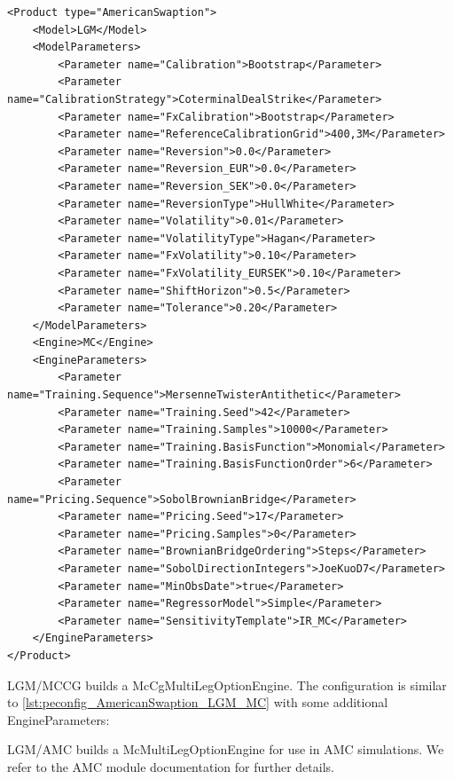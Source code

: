 \begin{longlisting}
\begin{verbatim}
<Product type="AmericanSwaption">
    <Model>LGM</Model>
    <ModelParameters>
        <Parameter name="Calibration">Bootstrap</Parameter>
        <Parameter name="CalibrationStrategy">CoterminalDealStrike</Parameter>
        <Parameter name="FxCalibration">Bootstrap</Parameter>
        <Parameter name="ReferenceCalibrationGrid">400,3M</Parameter>
        <Parameter name="Reversion">0.0</Parameter>
        <Parameter name="Reversion_EUR">0.0</Parameter>
        <Parameter name="Reversion_SEK">0.0</Parameter>
        <Parameter name="ReversionType">HullWhite</Parameter>
        <Parameter name="Volatility">0.01</Parameter>
        <Parameter name="VolatilityType">Hagan</Parameter>
        <Parameter name="FxVolatility">0.10</Parameter>
        <Parameter name="FxVolatility_EURSEK">0.10</Parameter>
        <Parameter name="ShiftHorizon">0.5</Parameter>
        <Parameter name="Tolerance">0.20</Parameter>
    </ModelParameters>
    <Engine>MC</Engine>
    <EngineParameters>
        <Parameter name="Training.Sequence">MersenneTwisterAntithetic</Parameter>
        <Parameter name="Training.Seed">42</Parameter>
        <Parameter name="Training.Samples">10000</Parameter>
        <Parameter name="Training.BasisFunction">Monomial</Parameter>
        <Parameter name="Training.BasisFunctionOrder">6</Parameter>
        <Parameter name="Pricing.Sequence">SobolBrownianBridge</Parameter>
        <Parameter name="Pricing.Seed">17</Parameter>
        <Parameter name="Pricing.Samples">0</Parameter>
        <Parameter name="BrownianBridgeOrdering">Steps</Parameter>
        <Parameter name="SobolDirectionIntegers">JoeKuoD7</Parameter>
        <Parameter name="MinObsDate">true</Parameter>
        <Parameter name="RegressorModel">Simple</Parameter>
        <Parameter name="SensitivityTemplate">IR_MC</Parameter>
    </EngineParameters>
</Product>
\end{verbatim}
\caption{Configuration for Product AmericanSwaption, Model BlackBachelier, Engine BlackBachelierSwaptionEngine}
\label{lst:peconfig_AmericanSwaption_LGM_MC}
\end{longlisting}

LGM/MCCG builds a McCgMultiLegOptionEngine. The configuration is similar to \ref{lst:peconfig_AmericanSwaption_LGM_MC}
with some additional EngineParameters:

LGM/AMC builds a McMultiLegOptionEngine for use in AMC simulations. We refer to the AMC module documentation for further
details.

